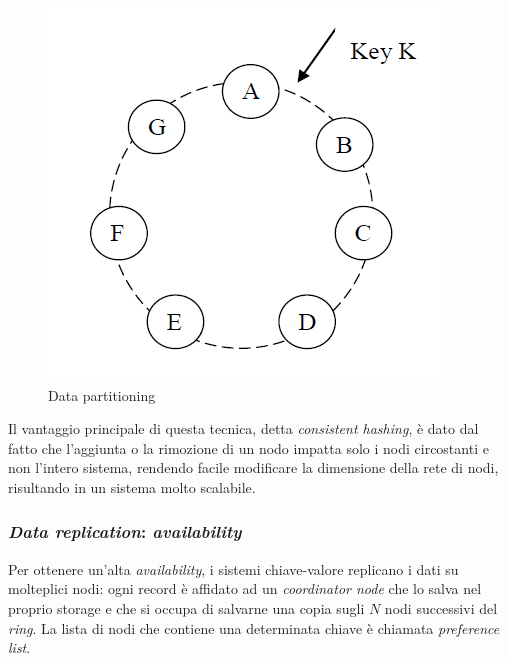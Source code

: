 \begin{figure}[!ht]
    \centering
    \includegraphics[width=.4\textwidth]{images/nodering.png}
    \caption{Data partitioning}
    \label{fig:part}
\end{figure}

Il vantaggio principale di questa tecnica, detta \textit{consistent hashing}, è dato dal fatto che l'aggiunta o la rimozione di un nodo impatta solo i nodi circostanti e non l'intero sistema, rendendo facile modificare la dimensione della rete di nodi, risultando in un sistema molto scalabile.


\subsubsection{\textit{Data replication}: \textit{availability}}
Per ottenere un'alta \textit{availability}, i sistemi chiave-valore replicano i dati su molteplici nodi: ogni record è affidato ad un \textit{coordinator node} che lo salva nel proprio storage e che si occupa di salvarne una copia sugli $N$ nodi successivi del \textit{ring}. La lista di nodi che contiene una determinata chiave è chiamata \textit{preference list}.

